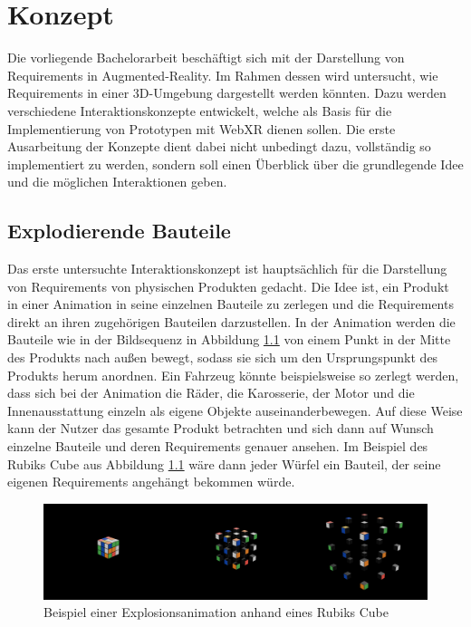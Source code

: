\chapter{Konzept}
\label{section:konzept}

Die vorliegende Bachelorarbeit beschäftigt sich mit der Darstellung von Requirements in Augmented-Reality.
Im Rahmen dessen wird untersucht, wie Requirements in einer 3D-Umgebung dargestellt werden könnten.
Dazu werden verschiedene Interaktionskonzepte entwickelt, welche als Basis für die Implementierung von Prototypen mit WebXR dienen sollen.
Die erste Ausarbeitung der Konzepte dient dabei nicht unbedingt dazu, vollständig so implementiert zu werden, sondern soll einen Überblick über die grundlegende Idee und die möglichen Interaktionen geben.


\section{Explodierende Bauteile}

Das erste untersuchte Interaktionskonzept ist hauptsächlich für die Darstellung von Requirements von physischen Produkten gedacht.
Die Idee ist, ein Produkt in einer Animation in seine einzelnen Bauteile zu zerlegen und die Requirements direkt an ihren zugehörigen Bauteilen darzustellen.
In der Animation werden die Bauteile wie in der Bildsequenz in Abbildung \ref{fig:rubiks-explosion} von einem Punkt in der Mitte des Produkts nach außen bewegt, sodass sie sich um den Ursprungspunkt des Produkts herum anordnen.
Ein Fahrzeug könnte beispielsweise so zerlegt werden, dass sich bei der Animation die Räder, die Karosserie, der Motor und die Innenausstattung einzeln als eigene Objekte auseinanderbewegen.
Auf diese Weise kann der Nutzer das gesamte Produkt betrachten und sich dann auf Wunsch einzelne Bauteile und deren Requirements genauer ansehen. 
Im Beispiel des Rubiks Cube aus Abbildung \ref{fig:rubiks-explosion} wäre dann jeder Würfel ein Bauteil, der seine eigenen Requirements angehängt bekommen würde.



\begin{figure}[H]
    \centering
    \includegraphics[width=1\textwidth]{images/RubiksExplosion.png}
    \caption{Beispiel einer Explosionsanimation anhand eines Rubiks Cube}
    \label{fig:rubiks-explosion}
\end{figure}

